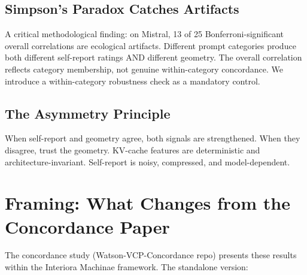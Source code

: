 \documentclass[11pt,letterpaper]{article}
\begin{document}
\subsection{Simpson's Paradox Catches Artifacts}

A critical methodological finding: on Mistral, 13 of 25 Bonferroni-significant overall correlations are ecological artifacts. Different prompt categories produce both different self-report ratings AND different geometry. The overall correlation reflects category membership, not genuine within-category concordance. We introduce a within-category robustness check as a mandatory control.

\subsection{The Asymmetry Principle}

When self-report and geometry agree, both signals are strengthened. When they disagree, trust the geometry. KV-cache features are deterministic and architecture-invariant. Self-report is noisy, compressed, and model-dependent.

\section{Framing: What Changes from the Concordance Paper}

The concordance study (Watson-VCP-Concordance repo) presents these results within the Interiora Machinae framework. The standalone version:
\end{document}
